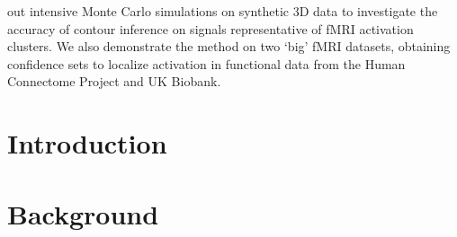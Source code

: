 \documentclass[11pt,a4paper]{report}      %
\begin{document}
\begin{thesisabstract}
\begin{singlespace}
out intensive Monte Carlo simulations on synthetic 3D data to investigate the accuracy of contour inference on signals representative of fMRI activation clusters. We also demonstrate the method on two `big' fMRI datasets, obtaining confidence sets to localize activation in functional data from the Human Connectome Project and UK Biobank.	


\end{singlespace}
\end{thesisabstract}



\chapter{Introduction}


\chapter{Background}

\end{document}
